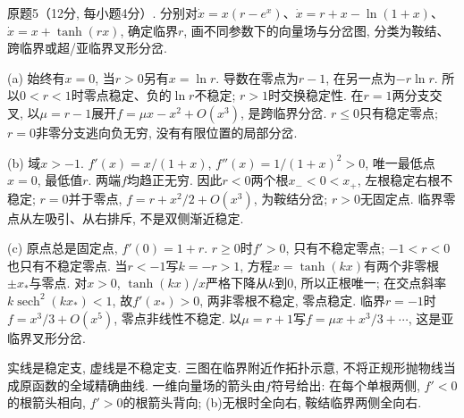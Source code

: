 \begin{exercise}
原题5（12分, 每小题4分）. 分别对$\dot x=x(r-e^x)$、$\dot x=r+x-\ln(1+x)$、$\dot x=x+\tanh(rx)$, 确定临界$r$, 画不同参数下的向量场与分岔图, 分类为鞍结、跨临界或超/亚临界叉形分岔.
\end{exercise}
\begin{solution}
(a) 始终有$x=0$, 当$r>0$另有$x=\ln r$. 导数在零点为$r-1$, 在另一点为$-r\ln r$. 所以$0<r<1$时零点稳定、负的$\ln r$不稳定; $r>1$时交换稳定性. 在$r=1$两分支交叉, 以$\mu=r-1$展开$f=\mu x-x^2+O(x^3)$, 是跨临界分岔. $r\le0$只有稳定零点; $r=0$非零分支逃向负无穷, 没有有限位置的局部分岔.

(b) 域$x>-1$. $f'(x)=x/(1+x)$, $f''(x)=1/(1+x)^2>0$, 唯一最低点$x=0$, 最低值$r$. 两端$f$均趋正无穷. 因此$r<0$两个根$x_-<0<x_+$, 左根稳定右根不稳定; $r=0$并于零点, $f=r+x^2/2+O(x^3)$, 为鞍结分岔; $r>0$无固定点. 临界零点从左吸引、从右排斥, 不是双侧渐近稳定.

(c) 原点总是固定点, $f'(0)=1+r$. $r\ge0$时$f'>0$, 只有不稳定零点; $-1<r<0$也只有不稳定零点. 当$r<-1$写$k=-r>1$, 方程$x=\tanh(kx)$有两个非零根$\pm x_*$与零点. 对$x>0$, $\tanh(kx)/x$严格下降从$k$到0, 所以正根唯一; 在交点斜率$k\operatorname{sech}^2(kx_*)<1$, 故$f'(x_*)>0$, 两非零根不稳定, 零点稳定. 临界$r=-1$时$f=x^3/3+O(x^5)$, 零点非线性不稳定. 以$\mu=r+1$写$f=\mu x+x^3/3+\cdots$, 这是亚临界叉形分岔.
\end{solution}
\begin{center}
\end{center}
实线是稳定支, 虚线是不稳定支. 三图在临界附近作拓扑示意, 不将正规形抛物线当成原函数的全域精确曲线. 一维向量场的箭头由$f$符号给出: 在每个单根两侧, $f'<0$的根箭头相向, $f'>0$的根箭头背向; (b)无根时全向右, 鞍结临界两侧全向右.


